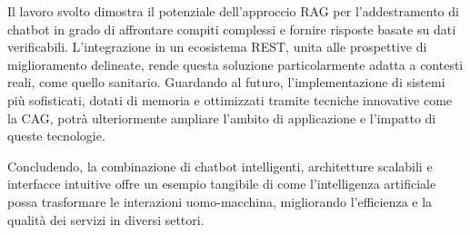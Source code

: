 \documentclass[a4paper,twoside,12pt]{toptesi}
\begin{document}
Il lavoro svolto dimostra il potenziale dell'approccio RAG per l'addestramento di chatbot in grado di affrontare compiti complessi e fornire risposte basate su dati verificabili. L'integrazione in un ecosistema REST, unita alle prospettive di miglioramento delineate, rende questa soluzione particolarmente adatta a contesti reali, come quello sanitario. Guardando al futuro, l'implementazione di sistemi più sofisticati, dotati di memoria e ottimizzati tramite tecniche innovative come la CAG, potrà ulteriormente ampliare l'ambito di applicazione e l'impatto di queste tecnologie.

Concludendo, la combinazione di chatbot intelligenti, architetture scalabili e interfacce intuitive offre un esempio tangibile di come l'intelligenza artificiale possa trasformare le interazioni uomo-macchina, migliorando l'efficienza e la qualità dei servizi in diversi settori.

  


\end{document}
